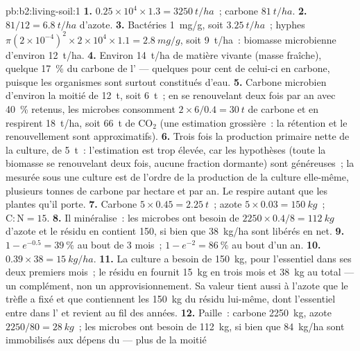 \begin{solution}{pb:b2:living-soil:1}
\textbf{1.} $0.25\times 10^{4}\times 1.3 = \qty{3250}{t/ha}$~;
carbone $\qty{81}{t/ha}$.
\textbf{2.} $81/12 = \qty{6.8}{t/ha}$ d'azote.
\textbf{3.} Bactéries \qty{1}{mg/g}, soit $\qty{3.25}{t/ha}$~; hyphes
$\pi(2\times 10^{-4})^{2}\times 2\times 10^{4}\times 1.1 =
\qty{2.8}{mg/g}$, soit \qty{9}{t/ha}~: biomasse microbienne d'environ
\qty{12}{t/ha}.
\textbf{4.} Environ \qty{14}{t/ha} de matière vivante (masse fraîche),
quelque \qty{17}{\%} du carbone de l' --- quelques pour cent de
celui-ci en carbone, puisque les organismes sont surtout constitués
d'eau.
\textbf{5.} Carbone microbien d'environ la moitié de \qty{12}{t}, soit
\qty{6}{t}~; en se renouvelant deux fois par an avec \qty{40}{\%}
retenus, les microbes consomment
$2\times 6/0.4 = \qty{30}{t}$ de carbone et en respirent \qty{18}{t/ha},
soit \qty{66}{t} de $\mathrm{CO_2}$ (une estimation grossière~: la
rétention et le renouvellement sont approximatifs).
\textbf{6.} Trois fois la production primaire nette de la culture, de
\qty{5}{t}~: l'estimation est trop élevée, car les hypothèses (toute la
biomasse se renouvelant deux fois, aucune fraction dormante) sont
généreuses~; la  mesurée sous une culture est de l'ordre de la
production de la culture elle-même, plusieurs tonnes de carbone par
hectare et par an. Le  respire autant que les plantes qu'il porte.
\textbf{7.} Carbone $5\times 0.45 = \qty{2.25}{t}$~; azote $5\times
0.03 = \qty{150}{kg}$~; $\mathrm{C:N} = 15$.
\textbf{8.} Il minéralise~: les microbes ont besoin de $2250\times 0.4/8 =
\qty{112}{kg}$ d'azote et le résidu en contient 150, si bien que
\qty{38}{kg/ha} sont libérés en net.
\textbf{9.} $1 - e^{-0.5} = \qty{39}{\%}$ au bout de 3 mois~; $1 - e^{-2}
= \qty{86}{\%}$ au bout d'un an.
\textbf{10.} $0.39\times 38 = \qty{15}{kg/ha}$.
\textbf{11.} La culture a besoin de \qty{150}{kg}, pour l'essentiel dans
ses deux premiers mois~; le résidu en fournit \qty{15}{kg} en trois mois
et \qty{38}{kg} au total --- un complément, non un approvisionnement. Sa
valeur tient aussi à l'azote que le trèfle a fixé et que contiennent les
\qty{150}{kg} du résidu lui-même, dont l'essentiel entre dans l' et
revient au fil des années.
\textbf{12.} Paille~: carbone \qty{2250}{kg}, azote $2250/80 =
\qty{28}{kg}$~; les microbes ont besoin de \qty{112}{kg}, si bien que
\qty{84}{kg/ha} sont immobilisés aux dépens du  --- plus de la moitié

\end{solution}
